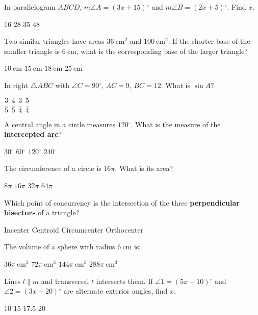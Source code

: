 \documentclass[12pt,addpoints]{exam}
\newcommand{\deg}{{}^\circ}
\begin{document}
\begin{questions}
\question In parallelogram $ABCD$, $m\angle A = (3x + 15)\deg$ and $m\angle B = (2x + 5)\deg$. Find $x$.
\begin{choices}
  \choice $16$
  \choice $28$
  \choice $35$
  \choice $48$
\end{choices}

\question Two similar triangles have areas $36~\text{cm}^2$ and $100~\text{cm}^2$. If the shorter base of the smaller triangle is $6~\text{cm}$, what is the corresponding base of the larger triangle?
\begin{choices}
  \choice $10~\text{cm}$
  \choice $15~\text{cm}$
  \choice $18~\text{cm}$
  \choice $25~\text{cm}$
\end{choices}

\question In right $\triangle ABC$ with $\angle C = 90\deg$, $AC = 9$, $BC = 12$. What is $\sin A$?
\begin{choices}
  \choice $\dfrac{3}{5}$
  \choice $\dfrac{4}{5}$
  \choice $\dfrac{3}{4}$
  \choice $\dfrac{5}{4}$
\end{choices}

\question A central angle in a circle measures $120\deg$. What is the measure of the \textbf{intercepted arc}?
\begin{choices}
  \choice $30\deg$
  \choice $60\deg$
  \choice $120\deg$
  \choice $240\deg$
\end{choices}

\question The circumference of a circle is $16\pi$. What is its area?
\begin{choices}
  \choice $8\pi$
  \choice $16\pi$
  \choice $32\pi$
  \choice $64\pi$
\end{choices}

\question Which point of concurrency is the intersection of the three \textbf{perpendicular bisectors} of a triangle?
\begin{choices}
  \choice Incenter
  \choice Centroid
  \choice Circumcenter
  \choice Orthocenter
\end{choices}

\question The volume of a sphere with radius $6~\text{cm}$ is:
\begin{choices}
  \choice $36\pi~\text{cm}^3$
  \choice $72\pi~\text{cm}^3$
  \choice $144\pi~\text{cm}^3$
  \choice $288\pi~\text{cm}^3$
\end{choices}

\question Lines $l \parallel m$ and transversal $t$ intersects them. If $\angle 1 = (5x - 10)\deg$ and $\angle 2 = (3x + 20)\deg$ are alternate exterior angles, find $x$.
\begin{choices}
  \choice $10$
  \choice $15$
  \choice $17.5$
  \choice $20$
\end{choices}


\end{questions}
\end{document}
